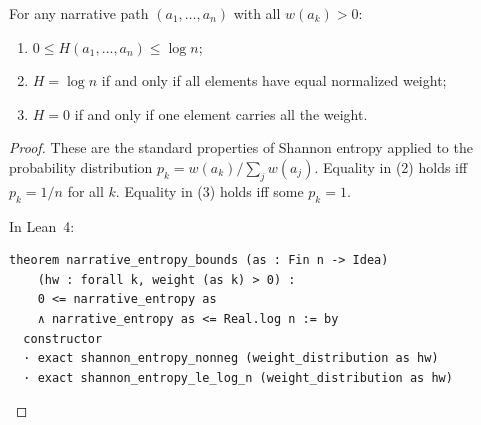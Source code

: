 \begin{theorem}
\label{thm:narrative-entropy-bounds}
For any narrative path $(a_1, \ldots, a_n)$ with all $w(a_k) > 0$:
\begin{enumerate}
  \item $0 \leq H(a_1, \ldots, a_n) \leq \log n$;
  \item $H = \log n$ if and only if all elements have equal normalized weight;
  \item $H = 0$ if and only if one element carries all the weight.
\end{enumerate}
\end{theorem}

\begin{proof}
These are the standard properties of Shannon entropy applied to the
probability distribution $p_k = w(a_k)/\sum_j w(a_j)$.  Equality in (2)
holds iff $p_k = 1/n$ for all $k$.  Equality in (3) holds iff some $p_k = 1$.

In Lean~4:
\begin{lstlisting}
theorem narrative_entropy_bounds (as : Fin n -> Idea)
    (hw : forall k, weight (as k) > 0) :
    0 <= narrative_entropy as
    ∧ narrative_entropy as <= Real.log n := by
  constructor
  · exact shannon_entropy_nonneg (weight_distribution as hw)
  · exact shannon_entropy_le_log_n (weight_distribution as hw)
\end{lstlisting}
\end{proof}


